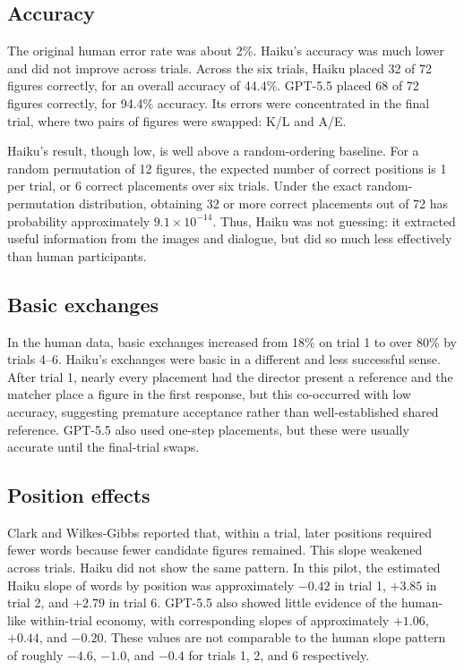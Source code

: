 \documentclass[11pt]{article}
\begin{document}
\subsection*{Accuracy}

The original human error rate was about 2\%. Haiku's accuracy was much lower and did not improve across trials. Across the six trials, Haiku placed 32 of 72 figures correctly, for an overall accuracy of 44.4\%. GPT-5.5 placed 68 of 72 figures correctly, for 94.4\% accuracy. Its errors were concentrated in the final trial, where two pairs of figures were swapped: K/L and A/E.

Haiku's result, though low, is well above a random-ordering baseline. For a random permutation of 12 figures, the expected number of correct positions is 1 per trial, or 6 correct placements over six trials. Under the exact random-permutation distribution, obtaining 32 or more correct placements out of 72 has probability approximately $9.1 \times 10^{-14}$. Thus, Haiku was not guessing: it extracted useful information from the images and dialogue, but did so much less effectively than human participants.

\subsection*{Basic exchanges}

In the human data, basic exchanges increased from 18\% on trial 1 to over 80\% by trials 4--6. Haiku's exchanges were basic in a different and less successful sense. After trial 1, nearly every placement had the director present a reference and the matcher place a figure in the first response, but this co-occurred with low accuracy, suggesting premature acceptance rather than well-established shared reference. GPT-5.5 also used one-step placements, but these were usually accurate until the final-trial swaps.

\subsection*{Position effects}

Clark and Wilkes-Gibbs reported that, within a trial, later positions required fewer words because fewer candidate figures remained. This slope weakened across trials. Haiku did not show the same pattern. In this pilot, the estimated Haiku slope of words by position was approximately $-0.42$ in trial 1, $+3.85$ in trial 2, and $+2.79$ in trial 6. GPT-5.5 also showed little evidence of the human-like within-trial economy, with corresponding slopes of approximately $+1.06$, $+0.44$, and $-0.20$. These values are not comparable to the human slope pattern of roughly $-4.6$, $-1.0$, and $-0.4$ for trials 1, 2, and 6 respectively.
\end{document}
